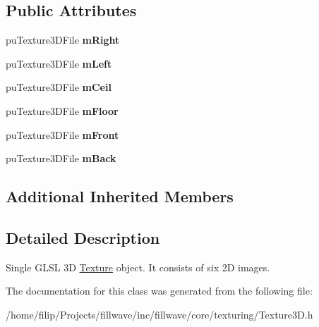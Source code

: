 \subsection*{Public Attributes}
\begin{DoxyCompactItemize}
\item 
pu\+Texture3\+D\+File {\bfseries m\+Right}\hypertarget{classflw_1_1flc_1_1Texture3D_a84851ce7f149ca0051359f88e808e29a}{}\label{classflw_1_1flc_1_1Texture3D_a84851ce7f149ca0051359f88e808e29a}

\item 
pu\+Texture3\+D\+File {\bfseries m\+Left}\hypertarget{classflw_1_1flc_1_1Texture3D_a5321ea66b5b8793b8ed6bf1e838660c0}{}\label{classflw_1_1flc_1_1Texture3D_a5321ea66b5b8793b8ed6bf1e838660c0}

\item 
pu\+Texture3\+D\+File {\bfseries m\+Ceil}\hypertarget{classflw_1_1flc_1_1Texture3D_abfaa2dbfe54e432ac8ba7c1abbdca298}{}\label{classflw_1_1flc_1_1Texture3D_abfaa2dbfe54e432ac8ba7c1abbdca298}

\item 
pu\+Texture3\+D\+File {\bfseries m\+Floor}\hypertarget{classflw_1_1flc_1_1Texture3D_a31f1d430f18ce4048c567b1bf9c3cb73}{}\label{classflw_1_1flc_1_1Texture3D_a31f1d430f18ce4048c567b1bf9c3cb73}

\item 
pu\+Texture3\+D\+File {\bfseries m\+Front}\hypertarget{classflw_1_1flc_1_1Texture3D_a8c7f5749ce29db32a6d31e53fb8d0ee8}{}\label{classflw_1_1flc_1_1Texture3D_a8c7f5749ce29db32a6d31e53fb8d0ee8}

\item 
pu\+Texture3\+D\+File {\bfseries m\+Back}\hypertarget{classflw_1_1flc_1_1Texture3D_adc6c2b0bb027a3186cf688b3d4cdb4d0}{}\label{classflw_1_1flc_1_1Texture3D_adc6c2b0bb027a3186cf688b3d4cdb4d0}

\end{DoxyCompactItemize}
\subsection*{Additional Inherited Members}


\subsection{Detailed Description}
Single G\+L\+SL 3D \hyperlink{classflw_1_1flc_1_1Texture}{Texture} object. It consists of six 2D images. 

The documentation for this class was generated from the following file\+:\begin{DoxyCompactItemize}
\item 
/home/filip/\+Projects/fillwave/inc/fillwave/core/texturing/Texture3\+D.\+h\end{DoxyCompactItemize}
